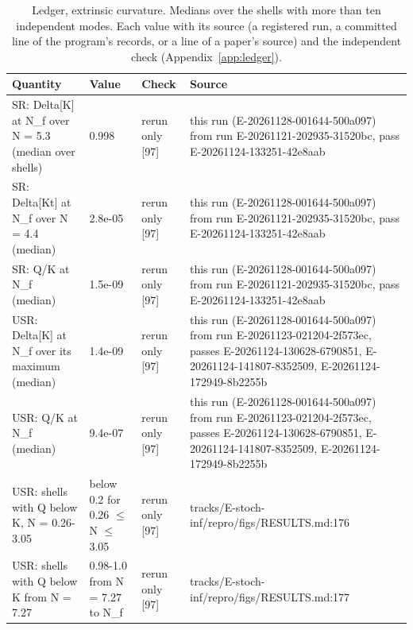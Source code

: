 \begin{table}
\caption{Ledger, extrinsic curvature. Medians over the shells with more than ten independent modes. Each value with its source (a registered run, a committed line of the program's records, or a line of a paper's source) and the independent check (Appendix~\ref{app:ledger}).}
\label{tab:ledgerextrinsiccurvature}
\footnotesize
\begin{tabular}{p{}p{}p{}p{}}
\toprule
Quantity & Value & Check & Source \\
\midrule
SR: Delta[K] at N\_f over N = 5.3 (median over shells) & 0.998 & rerun only [97] & this run (E-20261128-001644-500a097) from run E-20261121-202935-31520bc, pass E-20261124-133251-42e8aab \\
SR: Delta[Kt] at N\_f over N = 4.4 (median) & 2.8e-05 & rerun only [97] & this run (E-20261128-001644-500a097) from run E-20261121-202935-31520bc, pass E-20261124-133251-42e8aab \\
SR: Q/\allowbreak{}K at N\_f (median) & 1.5e-09 & rerun only [97] & this run (E-20261128-001644-500a097) from run E-20261121-202935-31520bc, pass E-20261124-133251-42e8aab \\
USR: Delta[K] at N\_f over its maximum (median) & 1.4e-09 & rerun only [97] & this run (E-20261128-001644-500a097) from run E-20261123-021204-2f573ec, passes E-20261124-130628-6790851, E-20261124-141807-8352509, E-20261124-172949-8b2255b \\
USR: Q/\allowbreak{}K at N\_f (median) & 9.4e-07 & rerun only [97] & this run (E-20261128-001644-500a097) from run E-20261123-021204-2f573ec, passes E-20261124-130628-6790851, E-20261124-141807-8352509, E-20261124-172949-8b2255b \\
USR: shells with Q below K, N = 0.26-3.05 & below 0.2 for 0.26 $\le$ N $\le$ 3.05 & rerun only [97] & tracks/\allowbreak{}E-stoch-inf/\allowbreak{}repro/\allowbreak{}figs/\allowbreak{}RESULTS.md:176 \\
USR: shells with Q below K from N = 7.27 & 0.98-1.0 from N = 7.27 to N\_f & rerun only [97] & tracks/\allowbreak{}E-stoch-inf/\allowbreak{}repro/\allowbreak{}figs/\allowbreak{}RESULTS.md:177 \\
\bottomrule
\end{tabular}
\end{table}

